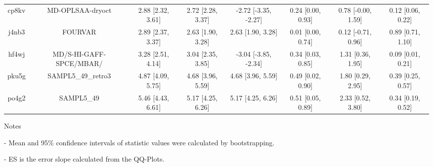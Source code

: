 \documentclass{article}
\begin{document}
\begin{center}
\begin{longtable}{|cccccccc|}
 cp8kv &                                   MD-OPLSAA-dryoct &  2.88 [2.32, 3.61] &  2.72 [2.28, 3.37] &  -2.72 [-3.35, -2.27] &  0.24 [0.00, 0.93] &   0.78 [-0.00, 1.59] &     0.12 [0.06, 0.22] \\
 j4nb3 &                                            FOURVAR &  2.89 [2.37, 3.37] &  2.63 [1.90, 3.28] &     2.63 [1.90, 3.28] &  0.01 [0.00, 0.74] &   0.12 [-0.71, 0.96] &     0.89 [0.71, 1.10] \\
 hf4wj &                            MD/S-HI-GAFF-SPCE/MBAR/ &  3.28 [2.51, 4.14] &  3.04 [2.35, 3.85] &  -3.04 [-3.85, -2.34] &  0.34 [0.03, 0.85] &    1.31 [0.36, 1.95] &     0.09 [0.01, 0.21] \\
 pku5g &                                 SAMPL5\_49\_retro3 &  4.87 [4.09, 5.75] &  4.68 [3.96, 5.59] &     4.68 [3.96, 5.59] &  0.49 [0.02, 0.90] &    1.80 [0.29, 2.95] &     0.39 [0.25, 0.57] \\
 po4g2 &                                         SAMPL5\_49 &  5.46 [4.43, 6.61] &  5.17 [4.25, 6.26] &     5.17 [4.25, 6.26] &  0.51 [0.05, 0.89] &    2.33 [0.52, 3.80] &     0.34 [0.19, 0.52] \\
\end{longtable}
\end{center}

Notes

- Mean and 95\% confidence intervals of statistic values were calculated by bootstrapping.

- ES is the error slope calculated from the QQ-Plots.
\end{document}
